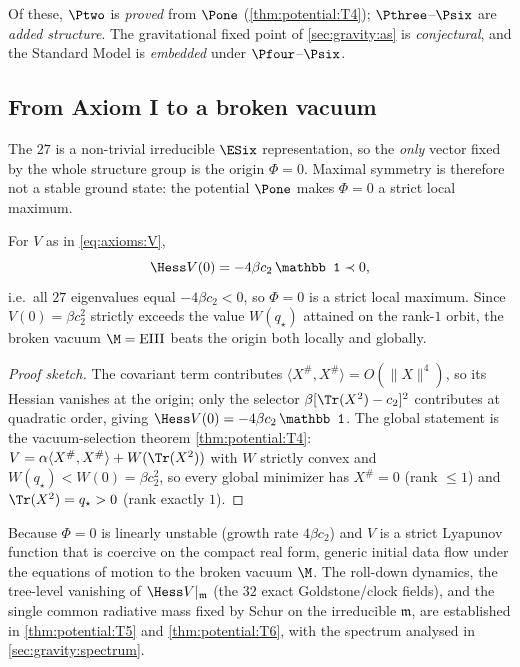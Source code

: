 \begin{remark}\label{rem:axioms:tagging}
Of these, $\Ptwo$ is \emph{proved} from $\Pone$ (\autoref{thm:potential:T4});
$\Pthree$--$\Psix$ are \emph{added structure}. The gravitational
fixed point of \autoref{sec:gravity:as} is \emph{conjectural}, and the
Standard Model is \emph{embedded} under $\Pfour$--$\Psix$.
\end{remark}

\subsection{From Axiom I to a broken vacuum}
\label{sec:axioms:broken}

The $27$ is a non-trivial irreducible $\ESix$ representation, so the
\emph{only} vector fixed by the whole structure group is the origin
$\Phi=0$. Maximal symmetry is therefore not a stable ground state: the
potential $\Pone$ makes $\Phi=0$ a strict local maximum.

\begin{theorem}\label{thm:axioms:origin}
For $V$ as in \eqref{eq:axioms:V},
\[
  \Hess V(0)=-4\beta c_2\,\mathbb 1\prec0,
\]
i.e.\ all $27$ eigenvalues equal $-4\beta c_2<0$, so $\Phi=0$ is a strict
local maximum. Since $V(0)=\beta c_2^2$ strictly exceeds the value
$W(q_\star)$ attained on the rank-$1$ orbit, the broken vacuum
$\M=\mathrm{EIII}$ beats the origin both locally and globally.
\end{theorem}

\begin{proof}[Proof sketch]
The covariant term contributes $\langle X^{\#},X^{\#}\rangle=O(\|X\|^4)$, so
its Hessian vanishes at the origin; only the selector $\beta[\Tr(X^2)-c_2]^2$
contributes at quadratic order, giving $\Hess V(0)=-4\beta c_2\,\mathbb 1$.
The global statement is the vacuum-selection theorem
\autoref{thm:potential:T4}: $V=\alpha\langle X^{\#},X^{\#}\rangle+W(\Tr(X^2))$
with $W$ strictly convex and $W(q_\star)<W(0)=\beta c_2^2$, so every global
minimizer has $X^{\#}=0$ (rank $\le1$) and $\Tr(X^2)=q_\star>0$ (rank
exactly $1$).
\end{proof}

\begin{remark}\label{rem:axioms:rolldown}
Because $\Phi=0$ is linearly unstable (growth rate $4\beta c_2$) and $V$ is a
strict Lyapunov function that is coercive on the compact real form, generic
initial data flow under the equations of motion to the broken vacuum $\M$.
The roll-down dynamics, the tree-level vanishing of $\Hess V|_{\mathfrak m}$
(the $32$ exact Goldstone/clock fields), and the single common radiative mass
fixed by Schur on the irreducible $\mathfrak m$, are established in
\autoref{thm:potential:T5} and \autoref{thm:potential:T6}, with the spectrum
analysed in \autoref{sec:gravity:spectrum}.
\end{remark}

